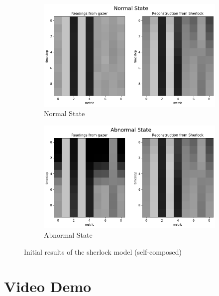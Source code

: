 \begin{figure}[H]
    \centering
    \begin{subfigure}[b]{0.7\textwidth}
        \centering
        \includegraphics[width=\textwidth]{assets/implementation/normal-state.png}
        \caption{Normal State}
        \label{fig:normal-state}
    \end{subfigure}
    \hfill
    \begin{subfigure}[b]{0.7\textwidth}
        \centering
        \includegraphics[width=\textwidth]{assets/implementation/abnormal-state.png}
        \caption{Abnormal State}
        \label{fig:abnormal-state}
    \end{subfigure}
    \hfill
       \caption{Initial results of the \ac{sherlock} model (self-composed)}
\end{figure}

\section{Video Demo}